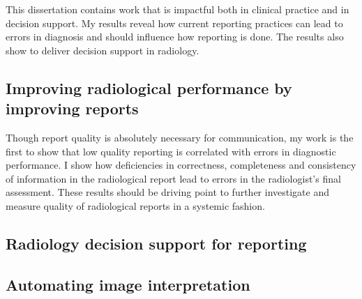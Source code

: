 This dissertation contains work that is impactful both in clinical practice and in decision support. My results reveal how current reporting practices can lead to errors in diagnosis and should influence how reporting is done. The results also show to deliver decision support in radiology.

\subsection{Improving radiological performance by improving reports}
Though report quality is absolutely necessary for communication, my work is the first to show that low quality reporting is correlated with errors in diagnostic performance. I show how deficiencies in correctness, completeness and consistency of information in the radiological report lead to errors in the radiologist's final assessment. These results should be driving point to further investigate and measure quality of radiological reports in a systemic fashion. 

\subsection{Radiology decision support for reporting}

\subsection{Automating image interpretation}